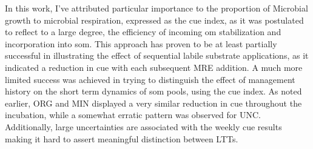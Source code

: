 In this work, I’ve attributed particular importance to the proportion of Microbial growth to microbial respiration, expressed as the \gls{cue} index, as it was postulated to reflect to a large degree, the efficiency of incoming \gls{om} stabilization and incorporation into \gls{som}. This approach has proven to be at least partially successful in illustrating the effect of sequential labile substrate applications, as it indicated a reduction in \gls{cue} with each subsequent MRE addition. A much more limited success was achieved in trying to distinguish the effect of management history on the short term dynamics of \gls{som} pools, using  the \gls{cue} index. As noted earlier, ORG and MIN displayed a very similar  reduction in \gls{cue} throughout the incubation, while a somewhat erratic pattern was observed for UNC. Additionally, large uncertainties are associated with the weekly \gls{cue} results making it hard to assert  meaningful distinction between LTTs.\\ 

